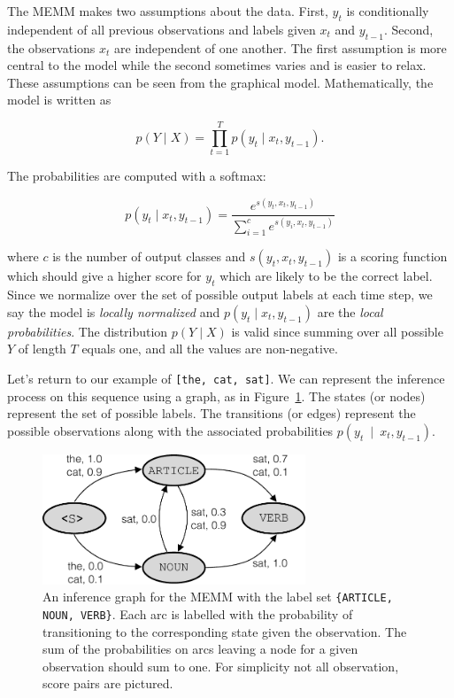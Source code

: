 \documentclass[11pt, letterpaper]{article}
\begin{document}
The MEMM makes two assumptions about the data. First, $y_t$ is conditionally
independent of all previous observations and labels given $x_t$ and $y_{t-1}$.
Second, the observations $x_t$ are independent of one another. The first
assumption is more central to the model while the second sometimes varies and
is easier to relax. These assumptions can be seen from the graphical model.
Mathematically, the model is written as

\begin{equation}
 p(Y \mid X) = \prod_{t=1}^T p(y_t \mid x_t, y_{t-1}).
\end{equation}

The probabilities are computed with a softmax:

\begin{equation}
 p(y_t \mid x_t, y_{t-1}) = \frac{e^{s(y_t, x_t, y_{t-1})}}{\sum_{i=1}^c e^{s(y_i, x_t, y_{t-1})}}
\end{equation}

where $c$ is the number of output classes and $s(y_t, x_t, y_{t-1})$ is a
scoring function which should give a higher score for $y_t$ which are likely to
be the correct label. Since we normalize over the set of possible output labels
at each time step, we say the model is \emph{locally normalized} and $p(y_t \mid
x_t, y_{t-1})$ are the \emph{local probabilities}. The distribution $p(Y \mid X)$ is
valid since summing over all possible $Y$ of length $T$ equals one, and all
the values are non-negative.

Let's return to our example of \texttt{[the, cat, sat]}. We can represent the
inference process on this sequence using a graph, as in
Figure~\ref{fig:memm_inf_norm}. The states (or nodes) represent the set of
possible labels. The transitions (or edges) represent the possible observations
along with the associated probabilities $p(y_t~\!\mid~\!x_t, y_{t-1})$.

\begin{figure}
    \centering
    \includegraphics[width=0.7\textwidth]{figures/memm_inference_normalized.pdf}
    \caption{An inference graph for the MEMM with the label set
    \texttt{\{ARTICLE, NOUN, VERB\}}.  Each arc is labelled with the
    probability of transitioning to the corresponding state given the
    observation. The sum of the probabilities on arcs leaving a node for a
    given observation should sum to one. For simplicity not all observation,
    score pairs are pictured.}
    \label{fig:memm_inf_norm}
\end{figure}
\end{document}
